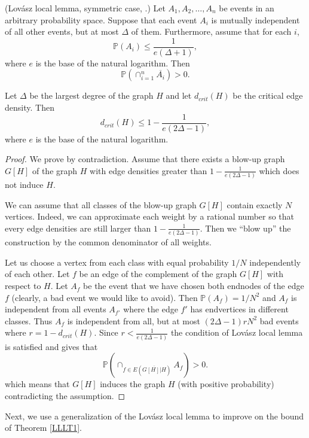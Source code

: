 \documentclass[12pt,a4paper]{amsart}
\numberwithin{equation}{section}
\begin{document}
\begin{theorem}\label{LLL} {\rm(Lov\'asz local lemma, symmetric case,
    \cite{alon}.)} Let 
  $A_1,A_2,\dots,A_n$ be events in an arbitrary probability space. Suppose
  that each event $A_i$ is mutually independent of all other events, but at
  most $\Delta$ of them. Furthermore, assume that for each $i$,
$$\mathbb{P}(A_i)\leq \frac{1}{e(\Delta+1)},$$
where $e$ is the base of the natural logarithm.
Then
$$\mathbb{P}(\cap_{i=1}^n \overline{A_i})>0.$$
\end{theorem}
   
\begin{theorem}\label{LLLT1} Let $\Delta$ be the largest degree of the graph $H$
  and let $d_{crit}(H)$ be the critical edge density. Then
$$d_{crit}(H)\leq 1-\frac{1}{e(2\Delta-1)},$$
where $e$ is the base of the natural logarithm.
\end{theorem}

\begin{proof} We prove by contradiction. Assume that there exists a blow-up
  graph $G[H]$ of the graph $H$ with edge densities greater than
  $1-\frac{1}{e(2\Delta-1)}$ which does not induce $H$. 

We can assume that all classes of the blow-up graph $G[H]$
contain exactly $N$ vertices. Indeed, we can approximate each weight by a
rational number so that every edge densities are still larger than
$1-\frac{1}{e(2\Delta-1)}$. Then we ``blow up'' the construction by the common
denominator of all weights.

Let us choose a vertex from each class with
equal probability $1/N$ independently of each other. Let $f$ be an edge of
the complement of the graph $G[H]$ with respect to $H$. Let $A_f$ be the event
that we have chosen both endnodes of the edge $f$ (clearly, a bad event we would
like to avoid).  Then $\mathbb{P}(A_f)=1/N^2$ and $A_f$ is independent from
all events $A_{f'}$ where the edge $f'$ has endvertices in different
classes. Thus $A_f$ is independent from all, but at most $(2\Delta-1)rN^2$ bad
events where $r=1-d_{crit}(H)$. Since $r<\frac{1}{e(2\Delta-1)}$ the condition of
Lov\'asz local lemma is satisfied and gives that
$$\mathbb{P}(\cap_{f\in E(\overline{G[H]|H})}A_f)>0.$$
which means that  $G[H]$ induces the graph $H$ (with positive probability)
contradicting the assumption.
\end{proof}

Next, we use a generalization of the Lov\'asz local lemma to improve on the bound
of Theorem \ref{LLLT1}. 
\bigskip
\end{document}
